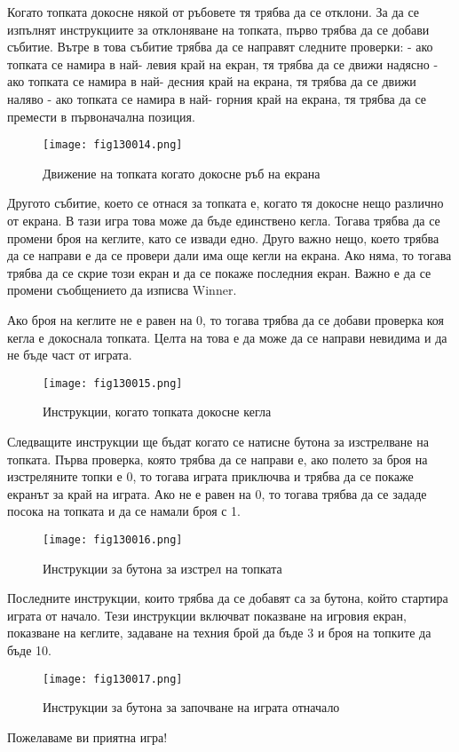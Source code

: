 Когато топката докосне някой от ръбовете тя трябва да се отклони. За да се изпълнят инструкциите за отклоняване на топката, първо трябва да се добави събитие. Вътре в това събитие трябва да се направят следните проверки:
- ако топката се намира в най- левия край на екран, тя трябва да се движи надясно
- ако топката се намира в най- десния край на екрана, тя трябва да се движи наляво
- ако топката се намира в най- горния край на екрана, тя трябва да се премести в първоначална позиция.

\begin{figure}[H]
  \centering
  \texttt{[image: fig130014.png]}
  \caption{Движение на топката когато докосне ръб на екрана}
\label{fig130014}
\end{figure}

Другото събитие, което се отнася за топката е, когато тя докосне нещо различно от екрана. В тази игра това може да бъде единствено кегла. Тогава трябва да се промени броя на кеглите, като се извади едно. Друго важно нещо, което трябва да се направи е да се провери дали има още кегли на екрана. Ако няма, то тогава трябва да се скрие този екран и да се покаже последния екран. Важно е да се промени съобщението да изписва Winner.

Ако броя на кеглите не е равен на 0, то тогава трябва да се добави проверка коя кегла е докоснала топката. Целта на това е да може да се направи невидима и да не бъде част от играта.

\begin{figure}[H]
  \centering
  \texttt{[image: fig130015.png]}
  \caption{Инструкции, когато топката докосне кегла}
\label{fig130015}
\end{figure}

Следващите инструкции ще бъдат когато се натисне бутона за изстрелване на топката. Първа проверка, която трябва да се направи е, ако полето за броя на изстреляните топки е 0, то тогава играта приключва и трябва да се покаже екранът за край на играта. Ако не е равен на 0, то тогава трябва да се зададе посока на топката и да се намали броя с 1.

\begin{figure}[H]
  \centering
  \texttt{[image: fig130016.png]}
  \caption{Инструкции за бутона за изстрел на топката}
\label{fig130016}
\end{figure}

Последните инструкции, които трябва да се добавят са за бутона, който стартира играта от начало. Тези инструкции включват показване на игровия екран, показване на кеглите, задаване на техния брой да бъде 3 и броя на топките да бъде 10.

\begin{figure}[H]
  \centering
  \texttt{[image: fig130017.png]}
  \caption{Инструкции за бутона за започване на играта отначало}
\label{fig130017}
\end{figure}

Пожелаваме ви приятна игра!
